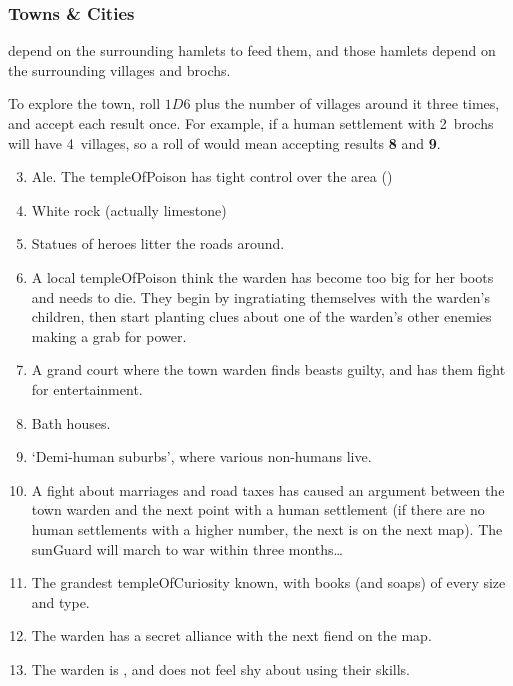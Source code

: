 \begin{multicols}{2}

\subsubsection{Towns \& Cities}
\label{mapTown}
depend on the surrounding hamlets to feed them, and those hamlets depend on the surrounding \glspl{village} and \glspl{broch}.

To explore the town, roll $1D6$ plus the number of \glspl{village} around it three times, and accept each result once.
For example, if a human settlement with 2~\glspl{broch} will have 4~\glspl{village}, so a roll of    would mean accepting results \textbf{8} and \textbf{9}.

\begin{enumerate}
\setcounter{enumi}{2}
  \item
  Ale.
  The \gls{templeOfPoison} has tight control over the area ()
  \item
  White rock (actually limestone)
  \item
  Statues of heroes litter the roads around.
  \item
  A local \gls{templeOfPoison} think the \gls{warden} has become too big for her boots and needs to die.
  They begin by ingratiating themselves with the \gls{warden}'s children, then start planting clues about one of the \gls{warden}'s other enemies making a grab for power.
  \item
  A grand \gls{court} where the town \gls{warden} finds beasts guilty, and has them fight for entertainment.
  \item
  Bath houses.
  \item
  `Demi-human suburbs', where various non-humans live.
  \item
  A fight about marriages and road taxes has caused an argument between the town \gls{warden} and the next point with a human settlement (if there are no human settlements with a higher number, the next is on the next map).
  The \gls{sunGuard} will march to war within three months\ldots
  \item
  The grandest \gls{templeOfCuriosity} known, with books (and soaps) of every size and type.
  \item
  The \gls{warden} has a secret alliance with the next fiend on the map.
  \item
  The \gls{warden} is , and does not feel shy about using their skills.
\end{enumerate}


\end{multicols}
